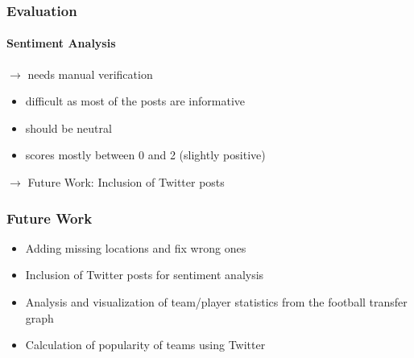 \documentclass{beamer}
\begin{document}
	\begin{frame}
    \frametitle{Evaluation}
		\framesubtitle{Sentiment Analysis}
		$\rightarrow$ needs manual verification
		\begin{itemize}
		\item difficult as most of the posts are informative
		\item should be neutral
		\item scores mostly between 0 and 2 (slightly positive)
		\end{itemize}
		$\rightarrow$ Future Work: Inclusion of Twitter posts 
  \end{frame}
	
	
	\begin{frame}
    \frametitle{Future Work}
		\begin{itemize}
      \item Adding missing locations and fix wrong ones
			\item Inclusion of Twitter posts for sentiment analysis
			\item Analysis and visualization of team/player statistics from the football transfer graph
			\item Calculation of popularity of teams using Twitter
		\end{itemize}
  \end{frame}
	
	
	
\end{document}
